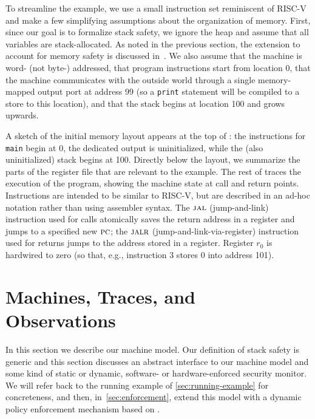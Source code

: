 \documentclass[acmsmall,review,anonymous]{acmart}\settopmatter{printfolios=true,printccs=false,printacmref=false}
\begin{document}
To streamline the example, we use a small instruction set reminiscent of
RISC-V and make a few simplifying assumptions about the organization of
memory.
%
First, since our goal is to formalize stack safety, we ignore the heap
and assume that all variables are stack-allocated. As noted in the
previous section, the extension to account for memory safety is
discussed in~.
%
We also assume that the machine is word- (not byte-) addressed, that program
instructions start from location 0, that the machine communicates with the
outside world through a single memory-mapped output port at address 99 (so
a {\tt print} statement will be compiled to a store to this
location), and that the stack begins at location 100 and grows upwards.

A sketch of the initial memory layout appears at the top of
: the instructions for {\tt main} begin at 0,
the dedicated output is uninitialized, while the (also uninitialized)
stack begins at 100. Directly below the layout, we summarize the parts
of the register file that are relevant to the example.
%
The rest of  traces the execution of the
program, showing the machine state at call and return points.
Instructions are intended to
be similar to RISC-V, but are described in an ad-hoc notation
rather than using assembler syntax. The $\textsc{jal}$ (jump-and-link)
instruction used for calls atomically saves the return address in a register
and jumps to a specified new $\textsc{pc}$; the $\textsc{jalr}$ (jump-and-link-via-register)
instruction used for returns jumps to the address stored in a register.
Register $r_0$ is hardwired to zero (so that, e.g., instruction 3 stores $0$
into address 101).



\section{Machines, Traces, and Observations}
\label{sec:prelim}

In this section we describe our machine model. Our definition of stack
safety is generic and this section discusses an abstract interface to
our machine model and some kind of static or dynamic, software- or
hardware-enforced security monitor. We will refer back to the running
example of \cref{sec:running-example} for concreteness, and then,
in~\cref{sec:enforcement}, extend this model with a dynamic policy
enforcement mechanism based on \citet{DBLP:conf/sp/RoesslerD18}.
\end{document}
